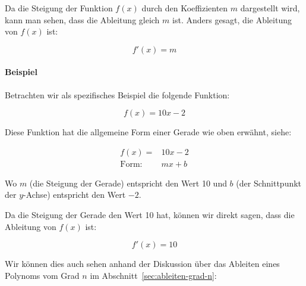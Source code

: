\documentclass{scrartcl}
\begin{document}
\begin{center}
\end{center}

Da die Steigung der Funktion $f(x)$ durch den Koeffizienten $m$ dargestellt
wird, kann man sehen, dass die Ableitung gleich $m$ ist.  Anders gesagt, die
Ableitung von $f(x)$ ist:

\begin{equation}
    f'(x) = m
\end{equation}

\paragraph{Beispiel} Betrachten wir als spezifisches Beispiel die folgende
Funktion:

\begin{equation}
    f(x) = 10 x - 2
\end{equation}

Diese Funktion hat die allgemeine Form einer Gerade wie oben erwähnt, siehe:

\begin{align}
    f(x) = & 10 x - 2\\
    \text{Form: } & m x + b
\end{align}

Wo $m$ (die Steigung der Gerade) entspricht den Wert 10 und $b$ (der
Schnittpunkt der $y$-Achse) entspricht den Wert $-2$.

Da die Steigung der Gerade den Wert 10 hat, können wir direkt sagen, dass
die Ableitung von $f(x)$ ist:

\begin{equation}
    f'(x) = 10
\end{equation}

Wir können dies auch sehen anhand der Diskussion über das Ableiten eines
Polynoms vom Grad $n$ im Abschnitt~\ref{sec:ableiten-grad-n}:
\end{document}
